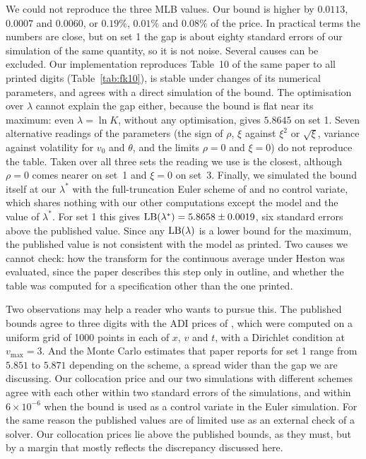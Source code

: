 We could not reproduce the three MLB values. Our bound is higher by $0.0113$, $0.0007$ and $0.0060$, or
$0.19\%$, $0.01\%$ and $0.08\%$ of the price. In practical terms the numbers are close, but on set 1 the
gap is about eighty standard errors of our simulation of the same quantity, so it is not noise. Several
causes can be excluded. Our implementation reproduces Table~10 of the same paper to all printed digits
(Table~\ref{tab:fk10}), is stable under changes of its numerical parameters, and agrees with a direct
simulation of the bound. The optimisation over $\lambda$ cannot explain the gap either, because the bound
is flat near its maximum: even $\lambda=\ln K$, without any optimisation, gives $5.8645$ on set 1. Seven
alternative readings of the parameters (the sign of $\rho$, $\xi$ against $\xi^2$ or $\sqrt\xi$, variance
against volatility for $v_0$ and $\theta$, and the limits $\rho=0$ and $\xi=0$) do not reproduce the table.
Taken over all three sets the reading we use is the closest, although $\rho=0$ comes nearer on set~1 and
$\xi=0$ on set~3. Finally, we simulated the bound itself at our $\lambda^\ast$ with the full-truncation Euler scheme of
\citet{LordKoekkoekvanDijk2010} and no control variate, which shares nothing with our other computations
except the model and the value of $\lambda^\ast$. For set 1 this gives $\mathrm{LB}(\lambda^\ast)=5.8658\pm0.0019$,
six standard errors above the published value. Since any $\mathrm{LB}(\lambda)$ is a lower bound for the maximum,
the published value is not consistent with the model as printed. Two causes we cannot check: how the transform for the continuous average under
Heston was evaluated, since the paper describes this step only in outline, and whether the table was
computed for a specification other than the one printed.

Two observations may help a reader who wants to pursue this. The published bounds agree to three digits
with the ADI prices of \citet{EwaldMenkensTing2013}, which were computed on a uniform grid of 1000 points in
each of $x$, $v$ and $t$, with a Dirichlet condition at $v_{\max}=3$. And the Monte Carlo estimates that
paper reports for set 1 range from $5.851$ to $5.871$ depending on the scheme, a spread wider than the gap
we are discussing. Our collocation price and our two simulations with different schemes agree with each
other within two standard errors of the simulations, and within $6\times10^{-6}$ when the bound is used
as a control variate in the Euler simulation. For the same reason the published values are of limited use
as an external check of a solver. Our collocation prices lie above the published bounds, as they must, but
by a margin that mostly reflects the discrepancy discussed here.
